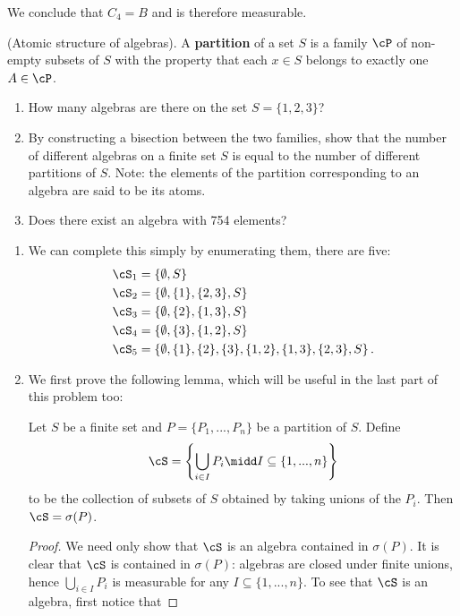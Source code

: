 \begin{homework}[e]
\begin{prf}
\begin{enumerate}[(1)]
				We conclude that $C_4 = B$ and is therefore measurable.
		\end{enumerate}
	\end{prf}
	\prob (Atomic structure of algebras). A \textbf{partition} of a set $S$ is a family $\cP$ of non-empty subsets of $S$ with the property that each $x \in S$ belongs to exactly one $A \in \cP$.
	\begin{enumerate}[(1)]
		\item How many algebras are there on the set $S = \{1,2,3\}$?
		\item By constructing a bisection between the two families, show that the number of different algebras on a finite set $S$ is equal to the number of different partitions of $S$. Note: the elements of the partition corresponding to an algebra are said to be its atoms.
		\item Does there exist an algebra with 754 elements?
	\end{enumerate}
	\begin{prf}
		\begin{enumerate}[(1)]
			\item We can complete this simply by enumerating them, there are five:
				\begin{align*}
					\cS_1 &= \left\{\emptyset, S\right\} \\
					\cS_2 &= \left\{\emptyset, \{1\}, \{2,3\}, S\right\} \\
					\cS_3 &= \left\{\emptyset, \{2\}, \{1,3\},S\right\} \\
					\cS_4 &= \left\{\emptyset, \{3\},\{1,2\},S\right\} \\
					\cS_5 &= \left\{\emptyset, \{1\},\{2\},\{3\},\{1,2\},\{1,3\},\{2,3\},S\right\}. 
				\end{align*}
			\item We first prove the following lemma, which will be useful in the last part of this problem too:
				\begin{lem}\label{lem:partition-sigma}
					Let $S$ be a finite set and $P = \{P_1,...,P_n\}$ be a partition of $S$. Define
					\begin{align*}
						\cS = \left\{\bigcup_{i \in I} P_i \midd I \subseteq \{1,...,n\}\right\} 
					\end{align*}
					to be the collection of subsets of $S$ obtained by taking unions of the $P_i$. Then $\cS = \sigma(P)$.
				\end{lem}
				\begin{proof}
					We need only show that $\cS$ is an algebra contained in $\sigma(P)$. It is clear that $\cS$ is contained in $\sigma(P)$: algebras are closed under finite unions, hence $\bigcup_{i\in I} P_i$ is measurable for any $I \subseteq \{1,...,n\}$. To see that $\cS$ is an algebra, first notice that 

\end{proof}
\end{enumerate}
\end{prf}
\end{homework}
